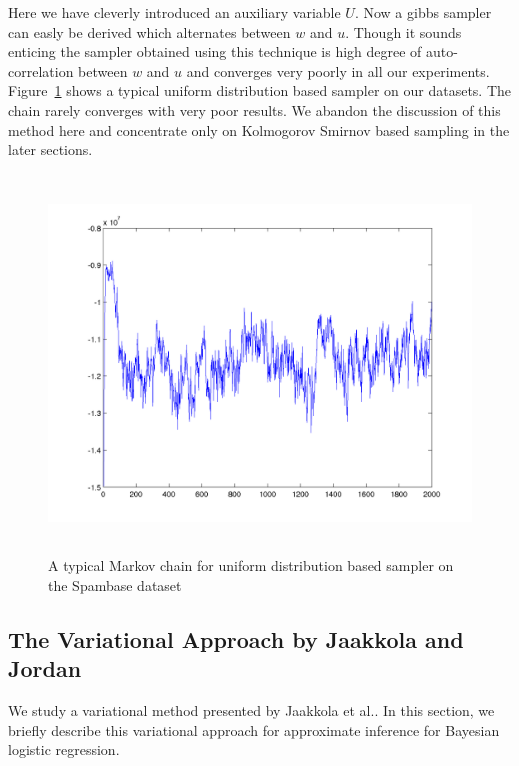 Here we have cleverly introduced an auxiliary variable $U$.
Now a gibbs sampler can easly be derived which alternates between $w$ and $u$.
Though it sounds enticing the sampler obtained using this technique is high
degree of auto-correlation between $w$ and $u$ and converges very poorly in all
our experiments. Figure~\ref{fig:uniformSamplerChain} shows a typical uniform
distribution based sampler on our datasets. The chain rarely converges with very
poor results. We abandon the discussion of this method here and
concentrate only on Kolmogorov Smirnov based sampling in the later sections.

\begin{figure}[t]
\label{fig:laplace}
\centering
\includegraphics[height=10.0cm]{results/uniformSampleChain.png}

\caption{A typical Markov chain for uniform distribution based sampler on the
Spambase dataset}

\label{fig:uniformSamplerChain}
\end{figure}






\subsection{The Variational Approach by Jaakkola and Jordan}
We study a variational method presented by Jaakkola et al.\cite{Jaakkola96avariational}. In this section, we briefly describe this variational approach for approximate inference for Bayesian logistic regression. 

